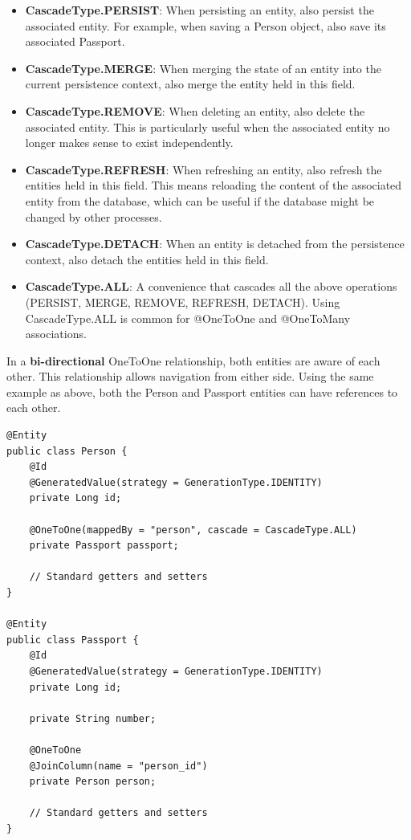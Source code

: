 \begin{itemize}
\item \textbf{CascadeType.PERSIST}: When persisting an entity, also persist the associated entity.  For example, when saving a Person object, also save its associated Passport.

\item \textbf{CascadeType.MERGE}: When merging the state of an entity into the current persistence context, also merge the entity held in this field.

\item \textbf{CascadeType.REMOVE}: When deleting an entity, also delete the associated entity. This is particularly useful when the associated entity no longer makes sense to exist independently.

\item \textbf{CascadeType.REFRESH}: When refreshing an entity, also refresh the entities held in this field. This means reloading the content of the associated entity from the database, which can be useful if the database might be changed by other processes.

\item \textbf{CascadeType.DETACH}: When an entity is detached from the persistence context, also detach the entities held in this field.

\item \textbf{CascadeType.ALL}: A convenience that cascades all the above operations (PERSIST, MERGE, REMOVE, REFRESH, DETACH). Using CascadeType.ALL is common for @OneToOne and @OneToMany associations.
\end{itemize}

In a \textbf{bi-directional} OneToOne relationship, both entities are aware of each other. This relationship allows navigation from either side. Using the same example as above, both the Person and Passport entities can have references to each other.

\begin{lstlisting}
@Entity
public class Person {
    @Id
    @GeneratedValue(strategy = GenerationType.IDENTITY)
    private Long id;

    @OneToOne(mappedBy = "person", cascade = CascadeType.ALL)
    private Passport passport;

    // Standard getters and setters
}

@Entity
public class Passport {
    @Id
    @GeneratedValue(strategy = GenerationType.IDENTITY)
    private Long id;

    private String number;

    @OneToOne
    @JoinColumn(name = "person_id")
    private Person person;

    // Standard getters and setters
}
\end{lstlisting}

